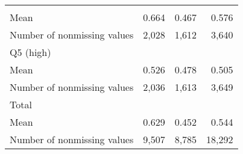 \documentclass{article}
\begin{document}
\begin{table}[!h]
\begin{tabular}{llll}
  \multicolumn{1}{r}{} &
  \multicolumn{1}{r}{} \\
\multicolumn{1}{l}{\hspace{2em}Mean} &
  \multicolumn{1}{|r}{0.664} &
  \multicolumn{1}{r}{0.467} &
  \multicolumn{1}{r}{0.576} \\
\multicolumn{1}{l}{\hspace{2em}Number of nonmissing values} &
  \multicolumn{1}{|r}{2,028} &
  \multicolumn{1}{r}{1,612} &
  \multicolumn{1}{r}{3,640} \\
\multicolumn{1}{l}{\hspace{1em}Q5 (high)} &
  \multicolumn{1}{|r}{} &
  \multicolumn{1}{r}{} &
  \multicolumn{1}{r}{} \\
\multicolumn{1}{l}{\hspace{2em}Mean} &
  \multicolumn{1}{|r}{0.526} &
  \multicolumn{1}{r}{0.478} &
  \multicolumn{1}{r}{0.505} \\
\multicolumn{1}{l}{\hspace{2em}Number of nonmissing values} &
  \multicolumn{1}{|r}{2,036} &
  \multicolumn{1}{r}{1,613} &
  \multicolumn{1}{r}{3,649} \\
\multicolumn{1}{l}{\hspace{1em}Total} &
  \multicolumn{1}{|r}{} &
  \multicolumn{1}{r}{} &
  \multicolumn{1}{r}{} \\
\multicolumn{1}{l}{\hspace{2em}Mean} &
  \multicolumn{1}{|r}{0.629} &
  \multicolumn{1}{r}{0.452} &
  \multicolumn{1}{r}{0.544} \\
\multicolumn{1}{l}{\hspace{2em}Number of nonmissing values} &
  \multicolumn{1}{|r}{9,507} &
  \multicolumn{1}{r}{8,785} &
  \multicolumn{1}{r}{18,292} \\
\cline{1-4}
\end{tabular}
\end{table}
\end{document}
